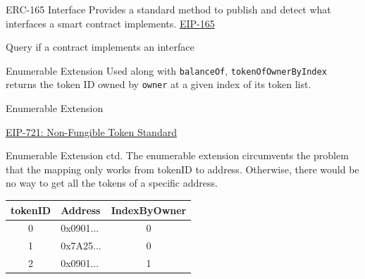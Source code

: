 \documentclass[handout]{beamer}
\begin{document}
\begin{frame}{ERC-165 Interface}
Provides a standard method to publish and detect what interfaces a smart contract implements. \link \href{https://eips.ethereum.org/EIPS/eip-165}{EIP-165}
\vspace{1em}
	\begin{samplecode}{Query if a contract implements an interface}
			
	\end{samplecode}
\vspace{1em}
\end{frame}

\begin{frame}{Enumerable Extension}
	Used along with \texttt{balanceOf}, \texttt{tokenOfOwnerByIndex} returns the token ID owned by \texttt{owner} at a given index of its token list.\vspace{0.5em}

 
	\begin{samplecode}{Enumerable Extension}
		
	\end{samplecode}
	\center
	\vspace{-0.5em}
	\link \href{https://eips.ethereum.org/EIPS/eip-721}{EIP-721: Non-Fungible Token Standard}
\end{frame}

\begin{frame}{Enumerable Extension ctd.}
The enumerable extension circumvents the problem that the mapping only works from tokenID to address. Otherwise, there would be no way to get all the tokens of a specific address.
\vspace{0.5em}
		\begin{table}
			\begin{tabular}{c|l|c}
			tokenID & Address & IndexByOwner\\
			\hline
			0 & 0x0901... & 0 \\
			1 & 0x7A25... & 0 \\
			2 & 0x0901... & 1
			\end{tabular}
		\end{table}
\end{frame}
\end{document}
